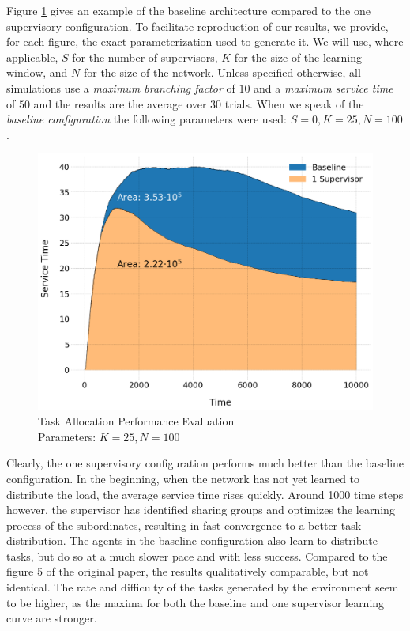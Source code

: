 \documentclass[letterpaper]{article}
\begin{document}
Figure \ref{fig:areas} gives an example of the baseline architecture compared to the one supervisory configuration. To facilitate reproduction of our results, we provide, for each figure, the exact parameterization used to generate it. We will use, where applicable, $S$ for the number of supervisors, $K$ for the size of the learning window, and $N$ for the size of the network. Unless specified otherwise, all simulations use a \textit{maximum branching factor} of $10$ and a \textit{maximum service time} of $50$ and the results are the average over 30 trials. When we speak of the \textit{baseline configuration} the following parameters were used: $S=0,K=25,N=100$.
\begin{figure}[H]
 \begin{center}
  \includegraphics[width=\linewidth]{figures/figure5_light}
  \caption{Task Allocation Performance Evaluation\\Parameters: $K=25,N=100$}
  \label{fig:areas}
 \end{center}
\end{figure}

Clearly, the one supervisory configuration performs much better than the baseline configuration. In the beginning, when the network has not yet learned to distribute the load, the average service time rises quickly. Around 1000 time steps however, the supervisor has identified sharing groups and optimizes the learning process of the subordinates, resulting in fast convergence to a better task distribution. The agents in the baseline configuration also learn to distribute tasks, but do so at a much slower pace and with less success. Compared to the figure 5 of the original paper, the results qualitatively comparable, but not identical. The rate and difficulty of the tasks generated by the environment seem to be higher, as the maxima for both the baseline and one supervisor learning curve are stronger.
\end{document}
